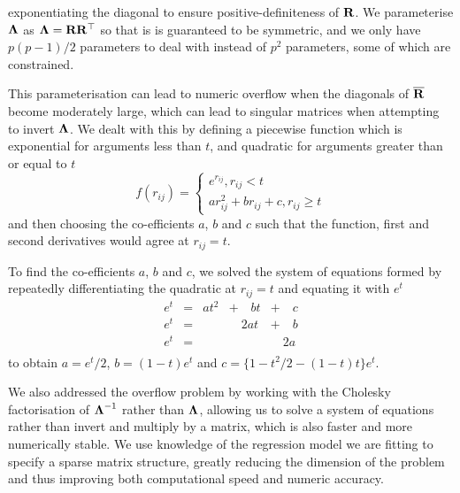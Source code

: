 	\noindent exponentiating the diagonal to ensure positive-definiteness of ${\bf R}$. We parameterise ${\boldsymbol \Lambda}$
	as ${\boldsymbol \Lambda} = {\bf R} {\bf R}^\top$ so that is is guaranteed to be symmetric, and we only have $p(p-1)/2$ 
	parameters to deal with instead of $p^2$ parameters, some of which are constrained. 
	
	This parameterisation can lead to numeric overflow when the diagonals of $\overline{{\bf R}}$ become moderately
	large, which can lead to singular matrices when attempting to invert ${\boldsymbol \Lambda}$. We dealt with this by
	defining a piecewise function which is exponential for arguments less than $t$, and quadratic for arguments
	greater than or equal to $t$
	$$
	f(r_{ij}) =
	\begin{cases}
		e^{r_{ij}}, r_{ij} < t                   \\
		a r_{ij}^2 + b r_{ij} + c, r_{ij} \geq t 
	\end{cases}
	$$
	and then choosing the co-efficients $a$, $b$ and $c$ such that the function, first and second derivatives would
	agree at $r_{ij} = t$.
	
	To find the co-efficients $a$, $b$ and $c$, we solved the system of equations formed by repeatedly 
	differentiating the quadratic at $r_{ij} =  t$ and equating it with $e^t$
	$$
	\begin{array}{lllll}
		e^t & = & a t^2 & + \quad b t & + \quad c \\
		e^t & = &       & \quad 2a t  & + \quad b \\
		e^t & = &       &             & \quad 2a  \\
	\end{array}
	$$
	to obtain $a = e^t / 2$, $b = (1 - t) e^t$ and $c = \{1 - t^2/2 - (1 - t) t\} e^t$.
	
	We also addressed the overflow problem by working with the Cholesky factorisation of ${\boldsymbol \Lambda}^{-1}$
	rather than ${\boldsymbol \Lambda}$, allowing us to solve a system of equations rather than invert and multiply by a
	matrix, which is also faster and more numerically stable. We use knowledge of the regression  model we are
	fitting to specify a sparse matrix structure, greatly reducing the dimension of   the problem and thus
	improving both computational speed and numeric accuracy.
	
		

